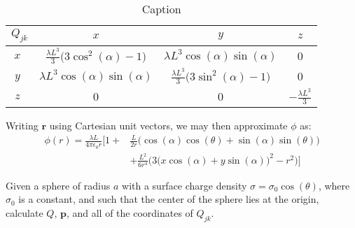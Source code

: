 \begin{solution}
\begin{table}[H]
\begin{tabular}{|c|c|c|c|}
                            \hline
                            $Q_{jk}$&$x$&$y$&$z$\\
                            \hline
                            $x\phantom{\bigg(}$&
                            $\frac{\lambda{L}^3}{3}\big(3\cos^{2}(\alpha)-1\big)$&
                            $\lambda{L}^{3}\cos(\alpha)\sin(\alpha)$&0\\
                            \hline
                            $y\phantom{\bigg(}$&
                            $\lambda{L}^{3}\cos(\alpha)\sin(\alpha)$&
                            $\frac{\lambda{L}^3}{3}\big(3\sin^{2}(\alpha)-1\big)$&0\\
                            \hline
                            $z\phantom{\bigg(}$&
                            0&0&$\minus\frac{\lambda{L}^{3}}{3}$\\
                            \hline
                        \end{tabular}
                        \caption{Caption}
                        \label{tab:my_label}
                    \end{table}
                    Writing $\mathbf{r}$ using Cartesian unit vectors,
                    we may then approximate $\phi$ as:
                    \begin{equation}
                        \begin{split}
                            \phi(r)=\frac{\lambda{L}}{4\pi\epsilon_{0}r}
                                \Big[1+&\frac{L}{2r}
                                    \big(\cos(\alpha)\cos(\theta)+
                                         \sin(\alpha)\sin(\theta)\big)\\
                                    &+\frac{L^{2}}{6r^{4}}
                                    \Big(3\big(x\cos(\alpha)+
                                         y\sin(\alpha)\big)^{2}-r^{2}\Big)
                                \Big]
                        \end{split}
                    \end{equation}
                \end{solution}
                \begin{problem}
                    Given a sphere of radius $a$ with a surface
                    charge density $\sigma=\sigma_{0}\cos(\theta)$, where
                    $\sigma_{0}$ is a constant, and such that the center
                    of the sphere lies at the origin, calculate $Q$,
                    $\mathbf{p}$, and all of the coordinates of $Q_{jk}$.
                \end{problem}
